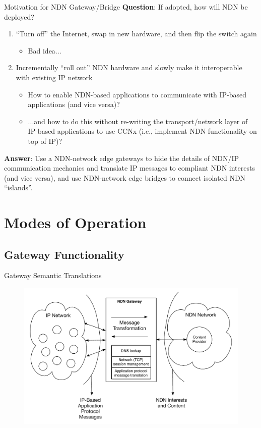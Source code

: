 \documentclass[handout]{beamer}
\begin{document}
\begin{frame}{Motivation for NDN Gateway/Bridge}
	\textbf{Question}: If adopted, how will NDN be deployed?
	\begin{enumerate}	
		\item ``Turn off'' the Internet, swap in new hardware, and then flip the switch again
		\begin{itemize}
			\item Bad idea...
		\end{itemize}
		\item Incrementally ``roll out'' NDN hardware and slowly make it interoperable with existing IP network
		\begin{itemize}
			\item How to enable NDN-based applications to communicate with IP-based applications (and vice versa)?
			\item ...and how to do this without re-writing the transport/network layer of IP-based applications to use CCNx (i.e., implement NDN functionality on top of IP)?
		\end{itemize}
	\end{enumerate}

	{\bf Answer}: Use a NDN-network edge gateways to hide the details of NDN/IP communication mechanics and translate IP messages to compliant NDN interests (and vice versa), and use NDN-network edge bridges to connect isolated NDN ``islands''.
\end{frame}

\section{Modes of Operation}
\subsection{Gateway Functionality}
\begin{frame}{Gateway Semantic Translations}
	\begin{figure}[h]
		\includegraphics[scale=0.4]{img/gateway_highlevel.pdf}
	\end{figure}
\end{frame}
\end{document}
